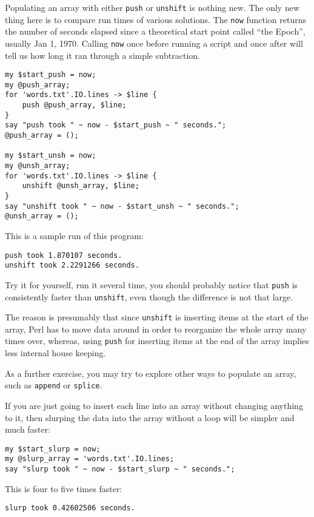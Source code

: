 {Populating an array with either {\tt push} or 
{\tt unshift} is nothing new. The only new thing 
here is to compare run times of various solutions.
The {\tt now} function returns the number of seconds 
elapsed since a theoretical start point called ``the 
Epoch'', usually Jan 1, 1970. Calling {\tt now} once 
before running a script and once after will tell 
us how long it ran through a simple subtraction.

\begin{verbatim}
my $start_push = now;
my @push_array;
for 'words.txt'.IO.lines -> $line {
    push @push_array, $line;
}
say "push took " ~ now - $start_push ~ " seconds.";
@push_array = ();

my $start_unsh = now;
my @unsh_array;
for 'words.txt'.IO.lines -> $line {
    unshift @unsh_array, $line;
}
say "unshift took " ~ now - $start_unsh ~ " seconds.";
@unsh_array = ();
\end{verbatim}

This is a sample run of this program:
\begin{verbatim}
push took 1.870107 seconds.
unshift took 2.2291266 seconds.
\end{verbatim}

Try it for yourself, run it several time, you should 
probably notice that {\tt push} is consistently 
faster than {\tt unshift}, even though the difference 
is not that large.

The reason is presumably that since {\tt unshift} is 
inserting items at the start of the array, Perl has 
to move data around in order to reorganize the whole 
array many times over, whereas, using {\tt push} 
for inserting items at the end of the array implies 
less internal house keeping.

As a further exercise, you may try to explore other 
ways to populate an array, such as {\tt append} or 
{\tt splice}.

If you are just going to insert each line into an 
array without changing anything to it, then slurping 
the data into the array without a loop will be simpler 
and much faster:

\begin{verbatim}
my $start_slurp = now;
my @slurp_array = 'words.txt'.IO.lines;
say "slurp took " ~ now - $start_slurp ~ " seconds.";
\end{verbatim}

This is four to five times faster:
\begin{verbatim}
slurp took 0.42602506 seconds.
\end{verbatim}

}
